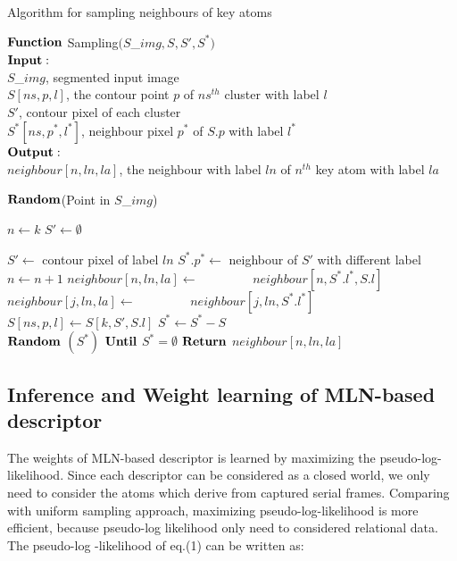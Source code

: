 \documentclass[journal]{IEEEtran}
\begin{document}
\begin{algorithm}
  \caption{Algorithm for sampling neighbours of key atoms}
   $\bf{Function}$ Sampling$(S$\_$img,S,S',S^*)$\\ 
  $\bf{Input:}$\\
   $S$\_$img$, segmented input image\\
   $S[ns,p,l]$, the contour point $p$ of $ns^{th}$ cluster with label $l$\\
   $S'$, contour pixel of each cluster\\
   $S^*[ns,p^*,l^*]$, neighbour pixel $p^*$ of $S.p$ with label $l^*$\\ 
  $\bf{Output:}$\\
  $neighbour[n,ln,la]$, the neighbour with label $ln$ of $n^{th}$ key atom with label  $la$         
  \begin{algorithmic}[1]
    \State $\bf{Random}$(Point in $S$\_$img$)
    
      \State $n\leftarrow k$
      \State $S'\leftarrow\emptyset$
     
      \State $S'\leftarrow$ contour pixel of label $ln$
      \State $S^*.p^*\leftarrow$ neighbour of $S'$ with different label
      	\State $n\leftarrow n+1$
      	\State $neighbour[n,ln,la]\leftarrow$
      	\State $\qquad\qquad neighbour[n,S^*.l^*,S.l]$
      	\EndIf 
      	\State $neighbour[j,ln,la]\leftarrow $
      	\State $\qquad\qquad neighbour[j,ln,S^*.l^*]$
      	\EndFor
      \EndFor
     \State $S[ns,p,l]\leftarrow S[k,S',S.l]$
     \State $S^*\leftarrow S^*-S$  
    \EndFor\\
    
	\State $\bf{Random}$ $(S^*)$
	\State $\bf{Until}$ $S^*=\emptyset$
	\State $\bf{Return}$ $neighbour[n,ln,la]$
    
  \end{algorithmic}
\end{algorithm}

\subsection{Inference and Weight learning of MLN-based descriptor}
The weights of MLN-based descriptor is learned by maximizing the pseudo-log-likelihood. Since each descriptor can be considered as a closed world, we only need to consider the atoms which derive from captured serial frames. Comparing with uniform sampling approach, maximizing pseudo-log-likelihood is more efficient, because pseudo-log likelihood only need to considered relational data. The pseudo-log -likelihood of eq.(1) can be written as:
\end{document}
